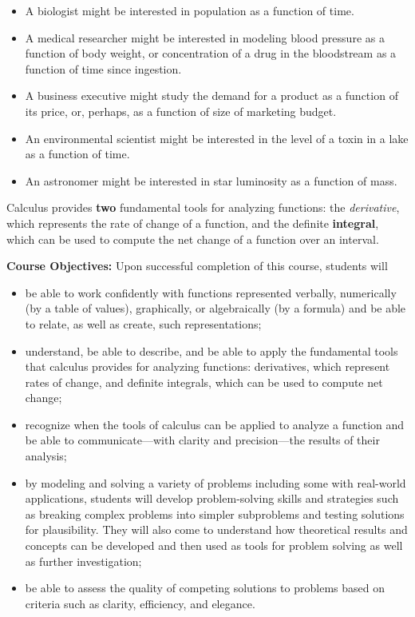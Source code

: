 \documentclass[11pt]{article}
\newcommand{\vs}{\vspace{0.5cm}}
\begin{document}
\begin{itemize}
\item A biologist might be interested in population as a function of time.
\item A medical researcher might be interested in modeling blood pressure as a function of body weight, or concentration of a drug in the bloodstream as a function of time since ingestion.
\item A business executive might study the demand for a product as a function of its price, or, perhaps, as a function of size of marketing budget.
\item An environmental scientist might be interested in the level of a toxin in a lake as a function of time.
\item An astronomer might be interested in star luminosity as a function of mass.
\end{itemize}

Calculus provides \textbf{two} fundamental tools for analyzing functions: the \textit{derivative}, which represents the rate of change of a function, and the definite \textbf{integral}, which can be used to compute the net change of a function over an interval.


\vs
\noindent\textbf{Course Objectives:}
Upon successful completion of this course, students will
\begin{itemize}
\item be able to work confidently with functions represented verbally, numerically (by a table of values), graphically, or algebraically (by a formula) and be able to relate, as well as create, such representations;
\item understand, be able to describe, and be able to apply the fundamental tools that calculus provides for analyzing functions: derivatives, which represent rates of change, and definite integrals, which can be used to compute net change;
\item recognize when the tools of calculus can be applied to analyze a function and be able to communicate---with clarity and precision---the results of their analysis;
\item  by modeling and solving a variety of problems including some with real-world applications, students will develop problem-solving skills and strategies such as breaking complex problems into simpler subproblems and testing solutions for plausibility. They will also come to understand how theoretical results and concepts can be developed and then used as tools for problem solving as well as further investigation;
\item be able to assess the quality of competing solutions to problems based on criteria such as clarity, efficiency, and elegance.
\end{itemize}
\end{document}
